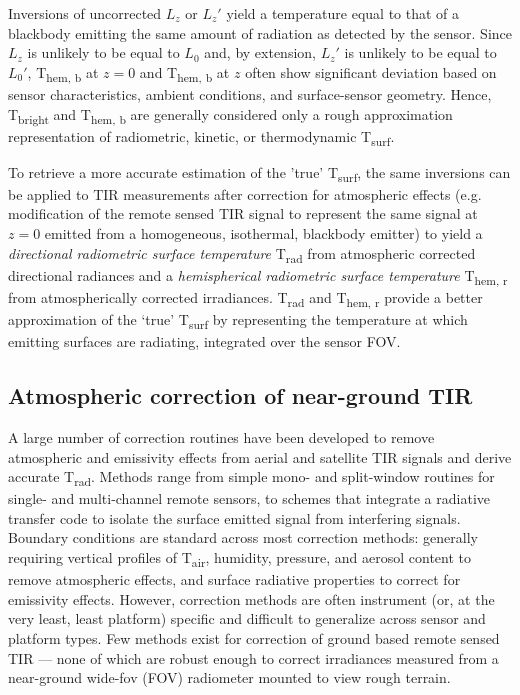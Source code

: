 Inversions of uncorrected $ L_z $ or \textbf{$L_z'$} yield a temperature equal to that of a blackbody emitting the same amount of radiation as detected by the sensor. Since $ L_z $ is unlikely to be equal to $ L_0 $ and, by extension,  $L_z'$ is unlikely to be equal to $L_0'$, T\textsubscript{hem, b} at $ z = 0 $ and T\textsubscript{hem, b} at $ z $ often show significant deviation based on sensor characteristics, ambient conditions, and surface-sensor geometry. Hence, T\textsubscript{bright} and T\textsubscript{hem, b} are generally considered only a rough approximation representation of radiometric, kinetic, or thermodynamic T\textsubscript{surf}.

To retrieve a more accurate estimation of the 'true' T\textsubscript{surf}, the same inversions can be applied to TIR measurements after correction for atmospheric effects (e.g. modification of the remote sensed TIR signal to represent the same signal at $ z = 0 $ emitted from a homogeneous, isothermal, blackbody emitter) to yield a \textit{directional radiometric surface temperature} T\textsubscript{rad} from atmospheric corrected directional radiances and a \textit{hemispherical radiometric surface temperature} T\textsubscript{hem, r} from atmospherically corrected irradiances. T\textsubscript{rad} and T\textsubscript{hem, r} provide a better approximation of the ‘true’ T\textsubscript{surf} by representing the temperature at which emitting surfaces are radiating, integrated over the sensor FOV.


\subsection{Atmospheric correction of near-ground TIR} \label{Atmospheric correction of near-ground TIR}

A large number of correction routines have been developed to remove atmospheric and emissivity effects from aerial and satellite TIR signals and derive accurate T\textsubscript{rad}. Methods range from simple mono- \cite{Qin2001} and split-window \cite{Wan1996} routines for single- and multi-channel remote sensors, to schemes that integrate a radiative transfer code to isolate the surface emitted signal from interfering signals. Boundary conditions are standard across most correction methods: generally requiring vertical profiles of T\textsubscript{air}, humidity, pressure, and aerosol content to remove atmospheric effects, and surface radiative properties to correct for emissivity effects. However, correction methods are often instrument (or, at the very least, least platform) specific and difficult to generalize across sensor and platform types. Few methods exist for correction of ground based remote sensed TIR --- none of which are robust enough to correct irradiances measured from a near-ground wide-\gls{fov} (FOV) radiometer mounted to view rough terrain. 

